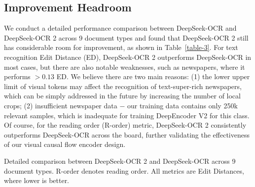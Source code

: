 \documentclass[11pt, a4paper, logo, copyright, nonumbering]{deepseek}
\begin{document}
\begin{CJK*}{UTF8}{gbsn}
\begin{table}[!t]
{\begin{tabular}{l|c|cccc|c}
			\bottomrule		
	\end{tabular}}		

	\label{table2}
\end{table}


\subsection{Improvement Headroom}

We conduct a detailed performance comparison between DeepSeek-OCR and DeepSeek-OCR 2 across 9 document types and found that DeepSeek-OCR 2 still has considerable room for improvement, as shown in Table~\ref{table-3}. For text recognition Edit Distance (ED), DeepSeek-OCR 2 outperforms DeepSeek-OCR in most cases, but there are also notable weaknesses, such as newspapers, where it performs $>0.13$ ED. We believe there are two main reasons: (1) the lower upper limit of visual tokens may affect the recognition of text-super-rich newspapers, which can be simply addressed in the future by increasing the number of local crops; (2) insufficient newspaper data $-$ our training data contains only 250k relevant samples, which is inadequate for training DeepEncoder V2 for this class. Of course, for the reading order (R-order) metric, DeepSeek-OCR 2 consistently outperforms DeepSeek-OCR across the board, further validating the effectiveness of our visual causal flow encoder design.


\begin{table}[ht]\small
    \centering	

    \caption{Detailed comparison between DeepSeek-OCR 2 and DeepSeek-OCR across 9 document types. R-order denotes reading order. All metrics are Edit Distances, where lower is better.}
    \setlength{\abovecaptionskip}{0.2cm}
    \setlength{\tabcolsep}{0.6mm}{
    
}
\end{table}
\end{CJK*}
\end{document}
